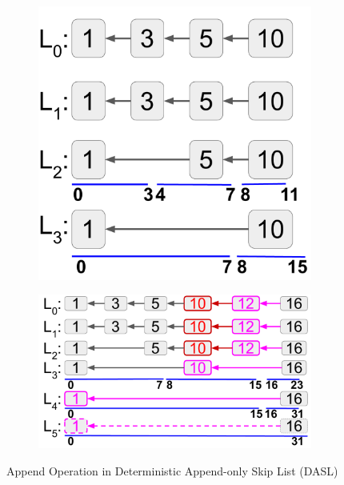 \begin{figure}
  \centering
  \begin{subfigure}{0.32\textwidth}
    \includegraphics[width=0.99\textwidth]{diagram/provenance/dasl_original.pdf}
    \caption{}
    \label{diagram:prov:dasl_original}
  \end{subfigure}
  \begin{subfigure}{0.54\textwidth}
    \includegraphics[width=0.99\textwidth]{diagram/provenance/dasl_appended.pdf}
    \caption{}
    \label{diagram:prov:dasl_appended}
  \end{subfigure}
  \caption{Append Operation in Deterministic Append-only Skip List (DASL)}
\end{figure}

